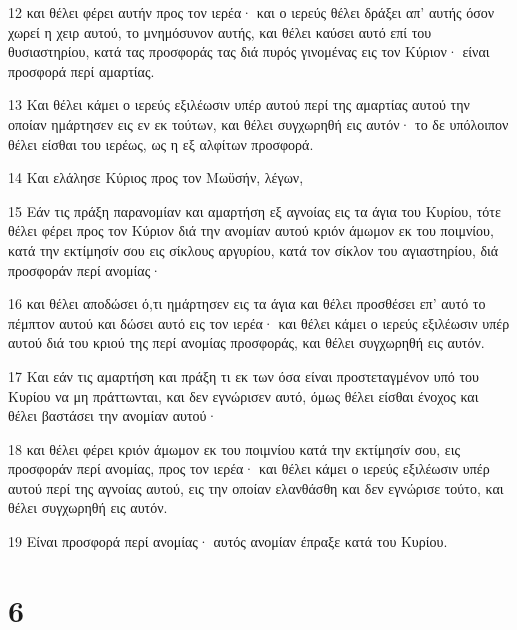 \par 12 και θέλει φέρει αυτήν προς τον ιερέα· και ο ιερεύς θέλει δράξει απ' αυτής όσον χωρεί η χειρ αυτού, το μνημόσυνον αυτής, και θέλει καύσει αυτό επί του θυσιαστηρίου, κατά τας προσφοράς τας διά πυρός γινομένας εις τον Κύριον· είναι προσφορά περί αμαρτίας.
\par 13 Και θέλει κάμει ο ιερεύς εξιλέωσιν υπέρ αυτού περί της αμαρτίας αυτού την οποίαν ημάρτησεν εις εν εκ τούτων, και θέλει συγχωρηθή εις αυτόν· το δε υπόλοιπον θέλει είσθαι του ιερέως, ως η εξ αλφίτων προσφορά.
\par 14 Και ελάλησε Κύριος προς τον Μωϋσήν, λέγων,
\par 15 Εάν τις πράξη παρανομίαν και αμαρτήση εξ αγνοίας εις τα άγια του Κυρίου, τότε θέλει φέρει προς τον Κύριον διά την ανομίαν αυτού κριόν άμωμον εκ του ποιμνίου, κατά την εκτίμησίν σου εις σίκλους αργυρίου, κατά τον σίκλον του αγιαστηρίου, διά προσφοράν περί ανομίας·
\par 16 και θέλει αποδώσει ό,τι ημάρτησεν εις τα άγια και θέλει προσθέσει επ' αυτό το πέμπτον αυτού και δώσει αυτό εις τον ιερέα· και θέλει κάμει ο ιερεύς εξιλέωσιν υπέρ αυτού διά του κριού της περί ανομίας προσφοράς, και θέλει συγχωρηθή εις αυτόν.
\par 17 Και εάν τις αμαρτήση και πράξη τι εκ των όσα είναι προστεταγμένον υπό του Κυρίου να μη πράττωνται, και δεν εγνώρισεν αυτό, όμως θέλει είσθαι ένοχος και θέλει βαστάσει την ανομίαν αυτού·
\par 18 και θέλει φέρει κριόν άμωμον εκ του ποιμνίου κατά την εκτίμησίν σου, εις προσφοράν περί ανομίας, προς τον ιερέα· και θέλει κάμει ο ιερεύς εξιλέωσιν υπέρ αυτού περί της αγνοίας αυτού, εις την οποίαν ελανθάσθη και δεν εγνώρισε τούτο, και θέλει συγχωρηθή εις αυτόν.
\par 19 Είναι προσφορά περί ανομίας· αυτός ανομίαν έπραξε κατά του Κυρίου.

\chapter{6}


